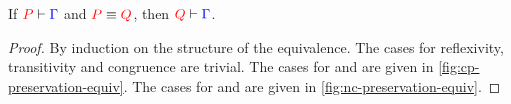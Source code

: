 \begin{theorem}\label{thm:nc-preservation-equiv}
  If $\seq[{ P }]{ \Gamma }$ and $\tm{P} \equiv \tm{Q}$,
  then $\seq[{ Q }]{ \Gamma }$.
\end{theorem}
\begin{proof}
  By induction on the structure of the equivalence. The cases for reflexivity,
  transitivity and congruence are trivial. The cases for \cpEquivCutComm and
   are given in \cref{fig:cp-preservation-equiv}.
  The cases for \ncEquivPoolComm and  are given in
  \cref{fig:nc-preservation-equiv}.
\end{proof}
